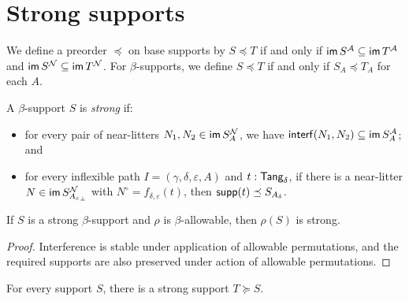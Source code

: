 \section{Strong supports}
\begin{definition}
  \label{def:StrSupport.Occurs}
  \leanok
  We define a preorder \( \preceq \) on base supports by \( S \preceq T \) if and only if \( \operatorname{\mathsf{im}} S^{\mathcal A} \subseteq \operatorname{\mathsf{im}} T^{\mathcal A} \) and \( \operatorname{\mathsf{im}} S^{\mathcal N} \subseteq \operatorname{\mathsf{im}} T^{\mathcal N} \).
  For \( \beta \)-supports, we define \( S \preceq T \) if and only if \( S_A \preceq T_A \) for each \( A \).
\end{definition}
\begin{definition}
  \label{def:Strong}
  \leanok
  A \( \beta \)-support \( S \) is \emph{strong} if:
  \begin{itemize}
    \item for every pair of near-litters \( N_1, N_2 \in \operatorname{\mathsf{im}} S_A^{\mathcal N} \), we have \( \operatorname{\mathsf{interf}}(N_1, N_2) \subseteq \operatorname{\mathsf{im}} S_A^{\mathcal A} \); and
    \item for every inflexible path \( I = (\gamma,\delta,\varepsilon,A) \) and \( t : \mathsf{Tang}_\delta \), if there is a near-litter \( N \in \operatorname{\mathsf{im}} S_{{A_\varepsilon}_\bot}^{\mathcal N} \) with \( N^\circ = f_{\delta,\varepsilon}(t) \), then \( \operatorname{\mathsf{supp}}(t) \preceq S_{A_\delta} \).
  \end{itemize}
\end{definition}
\begin{proposition}
  \label{prop:Strong.smul}
  \leanok
  If \( S \) is a strong \( \beta \)-support and \( \rho \) is \( \beta \)-allowable, then \( \rho(S) \) is strong.
\end{proposition}
\begin{proof}
  \leanok
  Interference is stable under application of allowable permutations, and the required supports are also preserved under action of allowable permutations.
\end{proof}
\begin{proposition}
  \label{prop:exists_strong}
  For every support \( S \), there is a strong support \( T \succeq S \).
\end{proposition}
